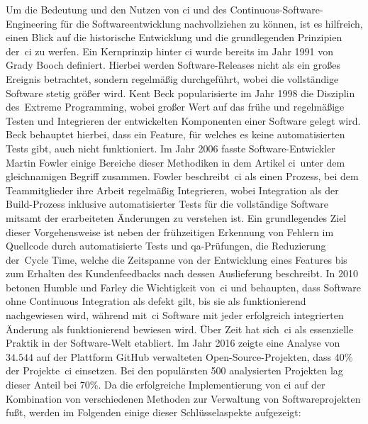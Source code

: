 Um die Bedeutung und den Nutzen von \acrlong{ci} und des Continuous-Software-Engineering für die
Softwareentwicklung nachvollziehen zu können, ist es hilfreich, einen Blick auf die historische Entwicklung und die
grundlegenden Prinzipien der\ \acrshort{ci} zu werfen.
Ein Kernprinzip hinter \acrlong{ci} wurde bereits im Jahr 1991 von Grady Booch definiert.
Hierbei werden Software-Releases nicht als ein großes Ereignis betrachtet, sondern regelmäßig durchgeführt, wobei
die vollständige Software stetig größer wird.
Kent Beck popularisierte im Jahr 1998 die Disziplin des\ \glqq Extreme Programming\grqq, wobei großer Wert auf das frühe
und regelmäßige Testen und Integrieren der entwickelten Komponenten einer Software gelegt wird.
Beck behauptet hierbei, dass ein Feature, für welches es keine automatisierten Tests gibt, auch nicht funktioniert.
Im Jahr 2006 fasste Software-Entwickler Martin Fowler einige Bereiche dieser Methodiken in dem Artikel
\glqq \acrlong{ci}\grqq\ unter dem gleichnamigen Begriff zusammen.
Fowler beschreibt\ \acrshort{ci} als einen Prozess, bei dem Teammitglieder ihre Arbeit regelmäßig Integrieren,
wobei Integration als der Build-Prozess inklusive automatisierter Tests für die vollständige Software mitsamt der
erarbeiteten Änderungen zu verstehen ist.
Ein grundlegendes Ziel dieser Vorgehensweise ist neben der frühzeitigen Erkennung von Fehlern im Quellcode durch
automatisierte Tests und \acrshort{qa}-Prüfungen, die Reduzierung der\ \glqq Cycle Time\grqq, welche die Zeitspanne von
der Entwicklung eines Features bis zum Erhalten des Kundenfeedbacks nach dessen Auslieferung beschreibt.
In 2010 betonen Humble und Farley die Wichtigkeit von\ \acrshort{ci} und behaupten, dass Software ohne Continuous
Integration als defekt gilt, bis sie als funktionierend nachgewiesen wird, während mit\ \acrshort{ci} Software mit
jeder erfolgreich integrierten Änderung als funktionierend bewiesen wird.
Über Zeit hat sich\ \acrshort{ci} als essenzielle Praktik in der Software-Welt etabliert.
Im Jahr 2016 zeigte eine Analyse von $34.544$ auf der Plattform GitHub verwalteten Open-Source-Projekten, dass 40\% der
Projekte\ \acrshort{ci} einsetzen.
Bei den populärsten 500 analysierten Projekten lag dieser Anteil bei 70\%.
Da die erfolgreiche Implementierung von \acrlong{ci} auf der Kombination von verschiedenen Methoden zur
Verwaltung von Softwareprojekten fußt, werden im Folgenden einige dieser Schlüsselaspekte aufgezeigt:


